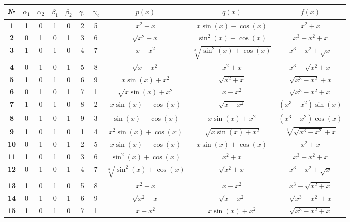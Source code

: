 \documentclass[a4paper,final,12pt]{article}
\begin{document}
\begin{center}\small
\begin{tabular}{|c|c|c|c|c|c|c|c|c|c|}
	\hline \bf№  & $\alpha_{1}$ & $\alpha_{2}$ & $\beta_{1}$ & $\beta_{2}$ & $\gamma_{1}$ & $\gamma_{2}$ & $p(x)$ & $q(x)$ & $f(x)$ 	\\
	\hline
	\hline \bf1  & 1 & 0 & 1 & 0 & 2 & 5 & $x^{2}+x$ & $x \sin (x)-\cos (x)$ & $x^{2}+x$ 												\\[6pt]
	\hline \bf2  & 0 & 1 & 0 & 1 & 3 & 6 & $\sqrt{x^{2}+x}$ & $\sin ^{2}(x)+\cos (x)$ & $x^{3}-x^{2}+x$ 								\\[6pt]
	\hline \bf3  & 1 & 0 & 1 & 0 & 4 & 7 & $x-x^{2}$ & $\sqrt[3]{\sin ^{2}(x)+\cos (x)}$ & $x^{3}-x^{2}+\sqrt{x}$ 						\\[6pt]
	\hline \bf4  & 0 & 1 & 0 & 1 & 5 & 8 & $\sqrt{x-x^{2}}$ & $x^{2}+x$ & $x^{3}-\sqrt{x^{2}+x}$ 										\\[6pt]
	\hline \bf5  & 1 & 0 & 1 & 0 & 6 & 9 & $x \sin (x)+x^{2}$ & $\sqrt{x^{2}+x}$ & $\sqrt{x^{3}-x^{2}}+x$ 								\\[6pt]
	\hline \bf6  & 0 & 1 & 0 & 1 & 7 & 1 & $\sqrt{x \sin (x)+x^{2}}$ & $x-x^{2}$ & $\sqrt{x^{3}-x^{2}+x}$ 								\\[6pt]
	\hline \bf7  & 1 & 0 & 1 & 0 & 8 & 2 & $x \sin (x)+\cos (x)$ & $\sqrt{x-x^{2}}$ & $\left(x^{3}-x^{2}\right) \sin (x)$ 				\\[6pt]
	\hline \bf8  & 0 & 1 & 0 & 1 & 9 & 3 & $\sin (x)+\cos (x)$ & $x \sin (x)+x^{2}$ & $\left(x^{3}-x^{2}\right) \cos (x)$ 				\\[6pt]
	\hline \bf9  & 1 & 0 & 1 & 0 & 1 & 4 & $x^{2} \sin (x)+\cos (x)$ & $\sqrt{x \sin (x)+x^{2}}$ & $\sqrt[3]{\!\!\sqrt{x^{3}-x^{2}}+x}$	\\[6pt]
	\hline \bf10 & 0 & 1 & 0 & 1 & 2 & 5 & $x \sin (x)-\cos (x)$ & $x \sin (x)+\cos (x)$ & $x^{2}+x$ 									\\[6pt]
	\hline \bf11 & 1 & 0 & 1 & 0 & 3 & 6 & $\sin ^{2}(x)+\cos (x)$ & $x^{2}+x$ & $x^{3}-x^{2}+x$ 										\\[6pt]
	\hline \bf12 & 0 & 1 & 0 & 1 & 4 & 7 & $\sqrt[3]{\sin ^{2}(x)+\cos (x)}$ & $\sqrt{x^{2}+x}$ & $x^{3}-x^{2}+\sqrt{x}$ 				\\[6pt]
	\hline \bf13 & 1 & 0 & 1 & 0 & 5 & 8 & $x^{2}+x$ & $x-x^{2}$ & $x^{3}-\sqrt{x^{2}+x}$ 												\\[6pt]
	\hline \bf14 & 0 & 1 & 0 & 1 & 6 & 9 & $\sqrt{x^{2}+x}$ & $\sqrt{x-x^{2}}$ & $\sqrt{x^{3}-x^{2}}+x$ 								\\[6pt]
	\hline \bf15 & 1 & 0 & 1 & 0 & 7 & 1 & $x-x^{2}$ & $x \sin (x)+x^{2}$ & $\sqrt{x^{3}-x^{2}+x}$ 										\\[6pt]

\end{tabular}
\end{center}
\end{document}
